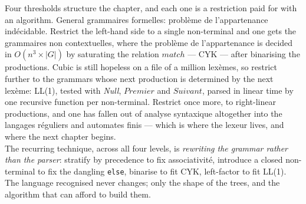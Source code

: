 \begin{conclusion}
  Four thresholds structure the chapter, and each one is a restriction paid for
  with an algorithm. General grammaires formelles: problème de l'appartenance
  indécidable. Restrict the left-hand side to a single non-terminal and one gets
  the grammaires non contextuelles, where the problème de l'appartenance is
  decided in $O(n^{3} \times |G|)$ by saturating the relation $\mathit{match}$
  --- CYK --- after binarising the productions. Cubic is still hopeless on a
  file of a million lexèmes, so restrict further to the grammars whose next
  production is determined by the next lexème: LL(1), tested with
  \textit{Null}, $\mathit{Premier}$ and $\mathit{Suivant}$, parsed in linear
  time by one recursive function per non-terminal. Restrict once more, to
  right-linear productions, and one has fallen out of analyse syntaxique
  altogether into the langages réguliers and automates finis --- which is where
  the lexeur lives, and where the next chapter begins.\\

  The recurring technique, across all four levels, is \emph{rewriting the
  grammar rather than the parser}: stratify by precedence to fix associativité,
  introduce a closed non-terminal to fix the dangling \verb|else|, binarise to
  fit CYK, left-factor to fit LL(1). The language recognised never changes; only
  the shape of the trees, and the algorithm that can afford to build them.
\end{conclusion}
